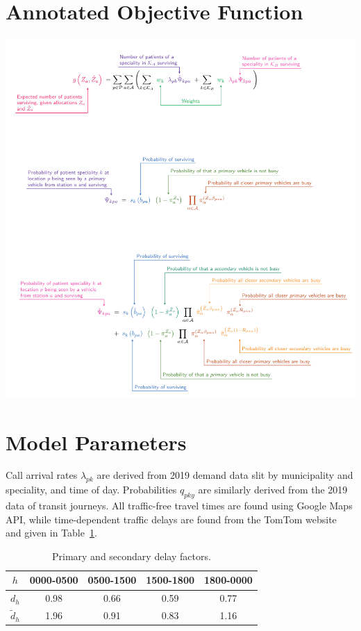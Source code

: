 \documentclass[preprint,12pt]{elsarticle}
\begin{document}
\section{Annotated Objective Function}\label{apx:annotated}
\includegraphics[width=\textwidth]{img/annotate}


\section{Model Parameters}\label{apx:parameters}
Call arrival rates $\lambda_{pk}$ are derived from 2019 demand data slit by
municipality and speciality, and time of day. Probabilities $q_{pky}$ are
similarly derived from the 2019 data of transit journeys. All traffic-free
travel times are found using Google Maps API, while time-dependent traffic
delays are found from the TomTom website and given in
Table~\ref{tbl:delay_factors}.

\begin{table}
\begin{center}
\begin{tabular}{ccccc}
\toprule
$h$ & 0000-0500 & 0500-1500 & 1500-1800 & 1800-0000 \\
\midrule
$d_h$ & 0.98 & 0.66 & 0.59 & 0.77 \\
$\tilde{d}_h$ & 1.96 & 0.91 & 0.83 & 1.16 \\
\bottomrule
\end{tabular}
\end{center}
\caption{Primary and secondary delay factors.}
\label{tbl:delay_factors}
\end{table}
\end{document}
